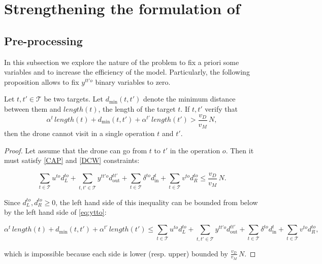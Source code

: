 \section{Strengthening the formulation of \AMD}\label{bounds}

\subsection{Pre-processing} \label{sec:preprocessing}
In this subsection we explore the nature of the problem to fix a priori some variables and to increase the efficiency of the model. Particularly, the following proposition allows to fix $y^{tt'o}$ binary variables to zero.

\begin{proposition}\label{prop:preprocessing}
Let $t, t'\in\mathcal T$ be two targets. Let $d_{\text{min}}(t, t')$ denote the minimum distance between them and $length(t)$, the length of the target $t$. If $t, t'$ verify that
\begin{equation}\label{eq:ytto}
    \alpha^t\,length(t) + d_{\text{min}}(t, t')  + \alpha^{t'}\,length(t') > \frac{v_D}{v_M}\,N, 
\end{equation}
then the drone cannot visit in  a single operation $t$ and $t'$.
\end{proposition}

\begin{proof}
Let assume that the drone can go from $t$ to $t'$ in the operation $o$. Then it must satisfy \eqref{CAP} and \eqref{DCW} constraints:

$$
\sum_{t\in \mathcal T} u^{to}d_L^{to} + \sum_{t, t'\in \mathcal T}y^{tt'o}d_{\text{out}}^{tt'} + \sum_{t\in\mathcal T} \delta^{to}d_{\text{in}}^{t} + \sum_{t\in \mathcal T} v^{to}d_R^{to} \leq \frac{v_D}{v_M}\,N.
$$

Since $d_L^{to}, d_R^{to}\geq 0$, the left hand side of this inequality can be  bounded from below by the left hand side of \eqref{eq:ytto}:

$$
\alpha^t\,length(t) + d_{\text{min}}(t, t')  + \alpha^{t'}\,length(t') \leq \sum_{t\in \mathcal T} u^{to}d_L^{to} + \sum_{t, t'\in \mathcal T}y^{tt'o}d_{\text{out}}^{tt'} + \sum_{t\in\mathcal T} \delta^{to}d_{\text{in}}^{t} + \sum_{t\in \mathcal T} v^{to}d_R^{to},
$$

which is impossible because each side is lower (resp. upper) bounded by $\frac{v_D}{v_M}\,N$. 

\end{proof}


